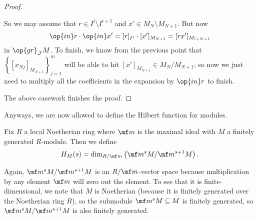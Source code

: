 \begin{proof}
\begin{itemize}
		So we may assume that $r\in I^i\setminus I^{i+1}$ and $x'\in M_N\setminus M_{N+1}$. But now
		\[\op{in}r\cdot\op{in}x'=[r]_{I^i}\cdot[x']_{M_{N+1}}=[rx']_{M_{i+N+1}}\]
		in $\op{gr}_\mathcal JM$. To finish, we know from the previous point that $\left\{[x_{Nj}]_{M_{N+1}}\right\}_{j=1}^m$ will be able to hit $[x']_{M_{N+1}}\in M_N/M_{N+1}$, so now we just need to multiply all the coefficients in the expansion by $\op{in}r$ to finish.
	\end{itemize}
	The above casework finishes the proof.
\end{proof}
Anyways, we are now allowed to define the Hilbert function for modules.
\begin{defi}
	Fix $R$ a local Noetherian ring where $\mf m$ is the maximal ideal with $M$ a finitely generated $R$-module. Then we define
	\[H_M(s)=\dim_{R/\mf m}\left(\mf m^sM/\mf m^{s+1}M\right).\]
\end{defi}
Again, $\mf m^sM/\mf m^{s+1}M$ is an $R/\mf m$-vector space because multiplication by any element $\mf m$ will zero out the element. To see that it is finite-dimensional, we note that $M$ is Noetherian (because it is finitely generated over the Noetherian ring $R$), so the submodule $\mf m^sM\subseteq M$ is finitely generated, so $\mf m^sM/\mf m^{s+1}M$ is also finitely generated.

